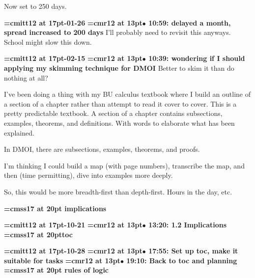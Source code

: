 Now set to 250 days.
\par

{\medskip\noindent\bf\font\titlefont=cmitt12 at 17pt-01-26}\medskip
{\smallskip\noindent\bf\font\titlefont=cmr12 at 13pt\titlefont $\bullet$ 10:59: delayed a month, spread increased to 200 days}\smallskip
I'll probably need to revisit this anyways. School might slow this down.
\par

{\medskip\noindent\bf\font\titlefont=cmitt12 at 17pt-02-15}\medskip
{\smallskip\noindent\bf\font\titlefont=cmr12 at 13pt\titlefont $\bullet$ 10:39: wondering if I should applying my skimming technique for DMOI}\smallskip
Better to skim it than do nothing at all?
\par

I've been doing a thing with my BU calculus textbook where I build an outline of a section of a chapter rather than attempt to read it cover to cover. This is a pretty predictable textbook. A section of a chapter contains subsections, examples, theorems, and definitions. With words to elaborate what has been explained.
\par

In DMOI, there are subsections, examples, theorems, and proofs.
\par

I'm thinking I could build a map (with page numbers), transcribe the map, and then (time permitting), dive into examples more deeply.
\par

So, this would be more breadth-first than depth-first. Hours in the day, etc.
\par

{\medskip\noindent\bf\font\titlefont=cmss17 at 20pt implications}\medskip

{\medskip\noindent\bf\font\titlefont=cmitt12 at 17pt-10-21}\medskip
{\smallskip\noindent\bf\font\titlefont=cmr12 at 13pt\titlefont $\bullet$ 13:20: 1.2 Implications}\smallskip
{}
{\medskip\noindent\bf\font\titlefont=cmss17 at 20pt\titlefont toc}\medskip

{\medskip\noindent\bf\font\titlefont=cmitt12 at 17pt-10-28}\medskip
{\smallskip\noindent\bf\font\titlefont=cmr12 at 13pt\titlefont $\bullet$ 17:55: Set up toc, make it suitable for tasks}\smallskip
{\smallskip\noindent\bf\font\titlefont=cmr12 at 13pt\titlefont $\bullet$ 19:10: Back to toc and planning}\smallskip
{}
{\medskip\noindent\bf\font\titlefont=cmss17 at 20pt rules of logic}\medskip

